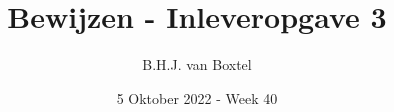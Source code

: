 \documentclass[12pt, dutch, a4paper]{article}
\theoremstyle{definition}
\begin{document}
\title{Bewijzen - Inleveropgave 3}
\author{B.H.J. van Boxtel}
\date{5 Oktober 2022 - Week 40} 

\maketitle
{} 
\end{document}

